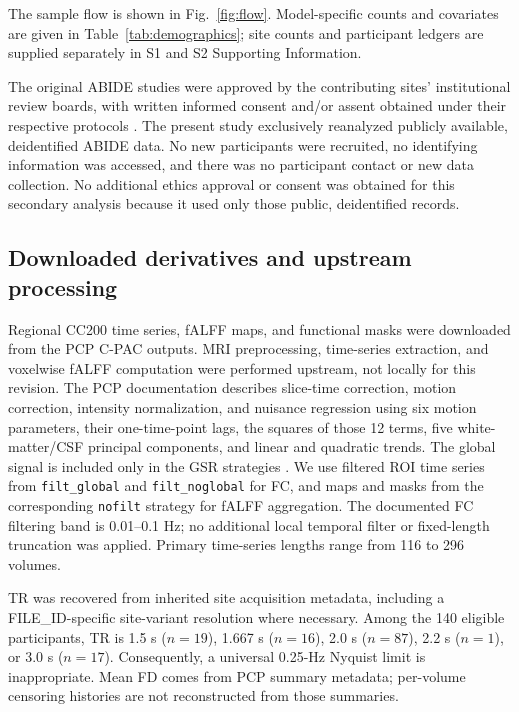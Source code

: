 \documentclass[10pt,letterpaper]{article}
\begin{document}
The sample flow is shown in Fig.~\ref{fig:flow}. Model-specific counts and
covariates are given in Table~\ref{tab:demographics}; site counts and participant
ledgers are supplied separately in S1 and S2 Supporting Information.

The original ABIDE studies were approved by the contributing sites' institutional
review boards, with written informed consent and/or assent obtained under their
respective protocols \cite{DiMartino:2014abide}. The present study exclusively
reanalyzed publicly available, deidentified ABIDE data. No new participants were
recruited, no identifying information was accessed, and there was no participant
contact or new data collection. No additional ethics approval or consent was
obtained for this secondary analysis because it used only those public,
deidentified records.

\subsection*{Downloaded derivatives and upstream processing}
Regional CC200 time series, fALFF maps, and functional masks were downloaded from
the PCP C-PAC outputs. MRI preprocessing, time-series extraction, and voxelwise
fALFF computation were performed upstream, not locally for this revision.
The PCP documentation describes slice-time correction, motion correction,
intensity normalization, and nuisance regression using six motion parameters,
their one-time-point lags, the squares of those 12 terms, five white-matter/CSF
principal components, and linear and quadratic trends. The global signal is
included only in the GSR strategies \cite{PCPdocumentationRevision}.
We use filtered ROI time series from \texttt{filt\_global} and
\texttt{filt\_noglobal} for FC, and maps and masks from the corresponding
\texttt{nofilt} strategy for fALFF aggregation. The documented FC filtering band
is 0.01--0.1 Hz; no additional local temporal filter or fixed-length truncation
was applied. Primary time-series lengths range from 116 to 296 volumes.

TR was recovered from inherited site acquisition metadata, including a
FILE\_ID-specific site-variant resolution where necessary. Among the 140 eligible
participants, TR is 1.5 s ($n=19$), 1.667 s ($n=16$), 2.0 s ($n=87$), 2.2 s
($n=1$), or 3.0 s ($n=17$). Consequently, a universal 0.25-Hz Nyquist limit is
inappropriate. Mean FD comes from PCP summary metadata; per-volume censoring
histories are not reconstructed from those summaries.
\end{document}
